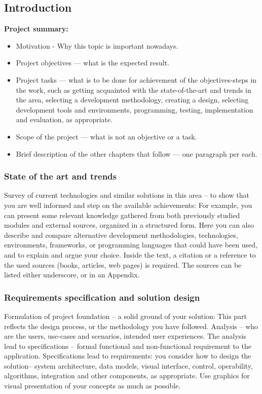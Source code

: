 \subsection{Introduction}

\textbf{Project summary:}
\begin{itemize}
    \item Motivation - Why this topic is important nowadays.
    \item Project objectives — what is the expected result.
    \item Project tasks — what is to be done for achievement of the objectives-steps in the work, such as getting acquainted with the state-of-the-art and trends in the area, selecting a development methodology, creating a design, selecting development tools and environments, programming, testing,  implementation and evaluation, as appropriate.
    \item Scope of the project — what is not an objective or a task.
    \item Brief description of the other chapters that follow — one paragraph per each.
\end{itemize}

\subsubsection{State of the art and trends}
Survey of current technologies and similar solutions in this area – to show that you are well informed and step on the available achievements: For example, you can present some relevant knowledge gathered from both previously studied modules and external sources, organized in a structured form. Here you can also describe and compare alternative development methodologies, technologies, environments, frameworks, or programming languages that could have been used, and to explain and argue your choice. Inside the text, a citation or a reference to the used sources (books, articles, web pages) is required. The sources can be listed either underscore, or in an Appendix.

\subsubsection{Requirements specification and solution design}
Formulation of project foundation – a solid ground of your solution: This part reflects the design process, or the methodology you have followed. Analysis – who are the users, use-cases and scenarios,  intended user experiences. The analysis lead to specifications – formal functional and non-functional requirement to the application. Specifications lead to requirements: you consider how to design the  solution– system architecture, data models, visual interface, control, operability, algorithms,  integration and other components, as appropriate. Use graphics for visual presentation of your concepts as much as possible.

